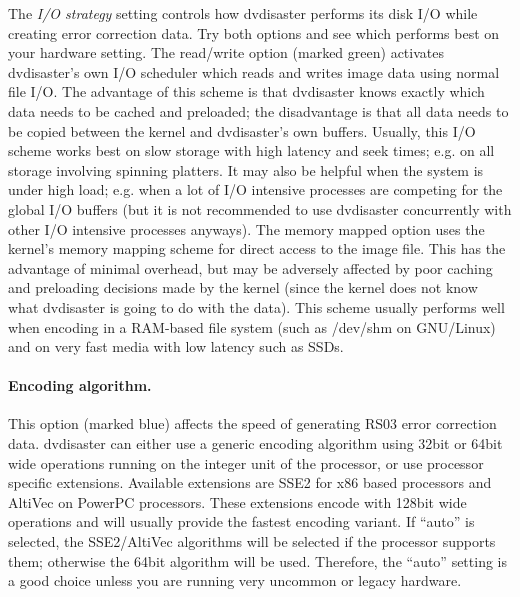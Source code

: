 The {\em I/O strategy} setting controls how dvdisaster performs its
disk I/O while creating error correction data. Try both options and
see which performs best on your hardware setting. The read/write
option (marked green) activates dvdisaster's own I/O scheduler
which reads and writes image data using normal file I/O. The
advantage of this scheme is that dvdisaster knows exactly which
data needs to be cached and preloaded; the disadvantage is that
all data needs to be copied between the kernel and dvdisaster's
own buffers. Usually, this I/O scheme works best on slow storage
with high latency and seek times; e.g. on all storage involving
spinning platters. It may also be helpful when the system is under
high load; e.g. when a lot of I/O intensive processes are competing
for the global I/O buffers (but it is not recommended to use dvdisaster
concurrently with other I/O intensive processes anyways). The memory
mapped option uses the kernel's memory mapping scheme for direct access
to the image file. This has the advantage of minimal overhead, but may
be adversely affected by poor caching and preloading decisions made by
the kernel (since the kernel does not know what dvdisaster is going to
do with the data). This scheme usually performs well when encoding in
a RAM-based file system (such as /dev/shm on GNU/Linux) and on very fast
media with low latency such as SSDs.

\paragraph{Encoding algorithm.} This option (marked blue) affects
the speed of generating RS03 error correction data. dvdisaster can
either use a generic encoding algorithm using 32bit or 64bit wide
operations running on the integer unit of the processor, or use
processor specific extensions. Available extensions are SSE2 for
x86 based processors and AltiVec on PowerPC processors. These
extensions encode with 128bit wide operations and will usually
provide the fastest encoding variant. If ``auto'' is selected,
the SSE2/AltiVec algorithms will be selected if the processor
supports them; otherwise the 64bit algorithm will be used. Therefore,
the ``auto'' setting is a good choice unless you are running very
uncommon or legacy hardware.

